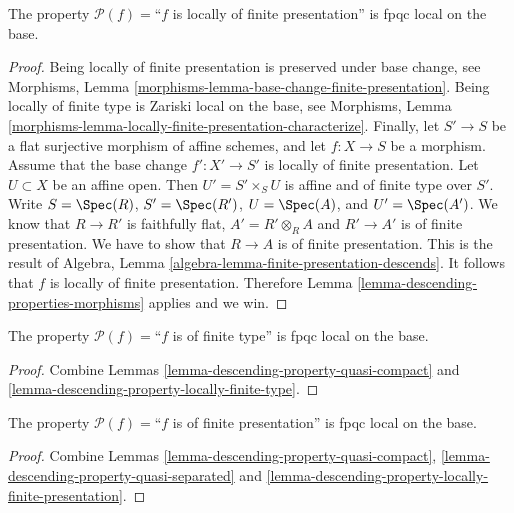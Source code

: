\begin{lemma}
\label{lemma-descending-property-locally-finite-presentation}
The property $\mathcal{P}(f) =$``$f$ is locally of finite presentation''
is fpqc local on the base.
\end{lemma}

\begin{proof}
Being locally of finite presentation is preserved under base change, see
Morphisms, Lemma \ref{morphisms-lemma-base-change-finite-presentation}.
Being locally of finite type is Zariski local on the base, see Morphisms,
Lemma \ref{morphisms-lemma-locally-finite-presentation-characterize}.
Finally, let
$S' \to S$ be a flat surjective morphism of affine schemes,
and let $f : X \to S$ be a morphism. Assume that the base change
$f' : X' \to S'$ is locally of finite presentation.
Let $U \subset X$ be an affine open. Then $U' = S' \times_S U$
is affine and of finite type over $S'$. Write
$S = \Spec(R)$,
$S' = \Spec(R')$,
$U = \Spec(A)$, and
$U' = \Spec(A')$.
We know that $R \to R'$ is faithfully flat,
$A' = R' \otimes_R A$ and $R' \to A'$ is of finite presentation.
We have to show that $R \to A$ is of finite presentation.
This is the result of
Algebra, Lemma \ref{algebra-lemma-finite-presentation-descends}.
It follows that $f$ is locally of finite presentation.
Therefore Lemma \ref{lemma-descending-properties-morphisms} applies and we win.
\end{proof}

\begin{lemma}
\label{lemma-descending-property-finite-type}
The property $\mathcal{P}(f) =$``$f$ is of finite type''
is fpqc local on the base.
\end{lemma}

\begin{proof}
Combine Lemmas \ref{lemma-descending-property-quasi-compact}
and \ref{lemma-descending-property-locally-finite-type}.
\end{proof}

\begin{lemma}
\label{lemma-descending-property-finite-presentation}
The property $\mathcal{P}(f) =$``$f$ is of finite presentation''
is fpqc local on the base.
\end{lemma}

\begin{proof}
Combine Lemmas \ref{lemma-descending-property-quasi-compact},
\ref{lemma-descending-property-quasi-separated} and
\ref{lemma-descending-property-locally-finite-presentation}.
\end{proof}

